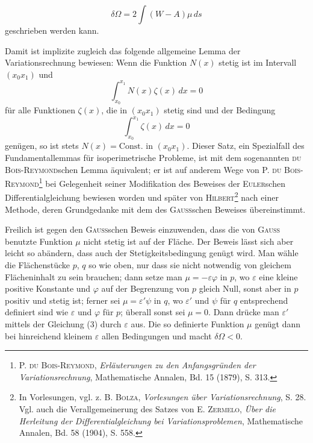 \begin{equation*}\tag{4}
\delta\Omega=2\int(W-A)\mu\,ds
\end{equation*}
geschrieben werden kann.
\par\noindent\hspace*{\parindent}Damit ist implizite zugleich das folgende allgemeine Lemma der Variationsrechnung bewiesen: Wenn die Funktion $N(x)$ stetig ist im Intervall $(x_0x_1)$ und
\[
\int_{x_0}^{x_1}N(x)\zeta(x)\,dx=0
\]
für alle Funktionen $\zeta(x)$, die in $(x_0x_1)$ stetig sind und der Bedingung
\[
\int_{x_0}^{x_1}\zeta(x)\,dx=0
\]
genügen, so ist stets $N(x)=\mathrm{Const.}$ in $(x_0x_1)$. Dieser Satz, ein Spezialfall
des Fundamentallemmas für isoperimetrische Probleme, ist mit dem sogenannten \textsc{du Bois-Reymond}schen Lemma äquivalent; er ist auf anderem Wege
von P. \textsc{du Bois-Reymond}\footnote{P. \textsc{du Bois-Reymond}, \textit{Erläuterungen zu den Anfangsgründen der Variationsrechnung}, Mathematische Annalen, Bd. 15 (1879), S. 313.} bei Gelegenheit seiner Modifikation des Beweises
der \textsc{Euler}schen Differentialgleichung bewiesen worden und später von \textsc{Hilbert}\footnote{In Vorlesungen, vgl. z. B. \textsc{Bolza}, \textit{Vorlesungen über Variationsrechnung}, S. 28. Vgl. auch die Verallgemeinerung des Satzes von E. \textsc{Zermelo}, \textit{Über die Herleitung der Differentialgleichung bei Variationsproblemen}, Mathematische Annalen, Bd. 58 (1904), S. 558.}
nach einer Methode, deren Grundgedanke mit dem des \textsc{Gauss}schen Beweises
übereinstimmt.
\par\noindent\hspace*{\parindent}Freilich ist gegen den \textsc{Gauss}schen Beweis einzuwenden, dass die von
\textsc{Gauss} benutzte Funktion $\mu$ nicht stetig ist auf der Fläche. Der Beweis lässt
sich aber leicht so abändern, dass auch der Stetigkeitsbedingung genügt wird.
Man wähle die Flächenstücke $p$, $q$ so wie oben, nur dass sie nicht notwendig
von gleichem Flächeninhalt zu sein brauchen; dann setze man $\mu=-\varepsilon\varphi$ in
$p$, wo $\varepsilon$ eine kleine positive Konstante und $\varphi$ auf der Begrenzung von $p$ gleich
Null, sonst aber in $p$ positiv und stetig ist; ferner sei $\mu=\varepsilon'\psi$ in $q$, wo $\varepsilon'$
und $\psi$ für $q$ entsprechend definiert sind wie $\varepsilon$ und $\varphi$ für $p$; überall sonst sei
$\mu=0$. Dann drücke man $\varepsilon'$ mittels der Gleichung (3) durch $\varepsilon$ aus. Die so
\clearpage{}
\noindent definierte Funktion $\mu$ genügt dann bei hinreichend kleinem $\varepsilon$ allen Bedingungen und macht $\delta\Omega<0$.
\clearpage\endgroup
